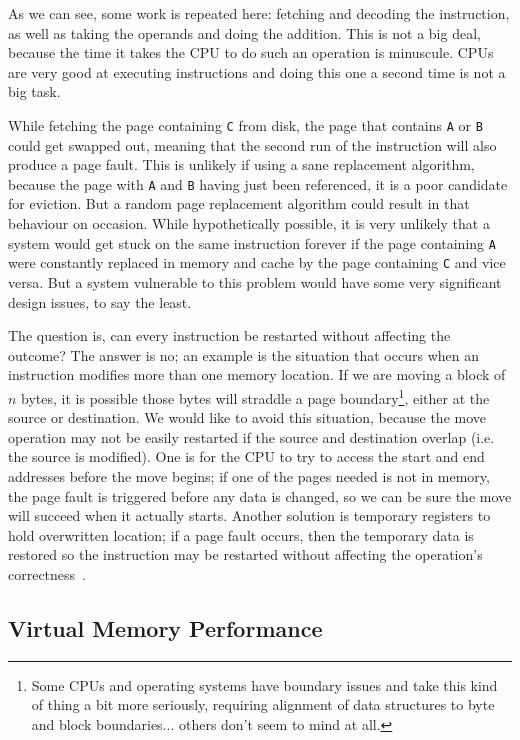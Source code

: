 As we can see, some work is repeated here: fetching and decoding the instruction, as well as taking the operands and doing the addition. This is not a big deal, because the time it takes the CPU to do such an operation is minuscule. CPUs are very good at executing instructions and doing this one a second time is not a big task.

While fetching the page containing \texttt{C} from disk, the page that contains \texttt{A} or \texttt{B} could get swapped out, meaning that the second run of the instruction will also produce a page fault. This is unlikely if using a sane replacement algorithm, because the page with \texttt{A} and \texttt{B} having just been referenced, it is a poor candidate for eviction. But a random page replacement algorithm could result in that behaviour on occasion. While hypothetically possible, it is very unlikely that a system would get stuck on the same instruction forever if the page containing \texttt{A} were constantly replaced in memory and cache by the page containing \texttt{C} and vice versa. But a system vulnerable to this problem would have some very significant design issues, to say the least.

The question is, can every instruction be restarted without affecting the outcome? The answer is no; an example is the situation that occurs when an instruction modifies more than one memory location. If we are moving a block of $n$ bytes, it is possible those bytes will straddle a page boundary\footnote{Some CPUs and operating systems have boundary issues and take this kind of thing a bit more seriously, requiring alignment of data structures to byte and block boundaries... others don't seem to mind at all.}, either at the source or destination. We would like to avoid this situation, because the move operation may not be easily restarted if the source and destination overlap (i.e. the source is modified). One is for the CPU to try to access the start and end addresses before the move begins; if one of the pages needed is not in memory, the page fault is triggered before any data is changed, so we can be sure the move will succeed when it actually starts. Another solution is temporary registers to hold overwritten location; if a page fault occurs, then the temporary data is restored so the instruction may be restarted without affecting the operation's correctness~\cite{osc}.

\subsection*{Virtual Memory Performance}


